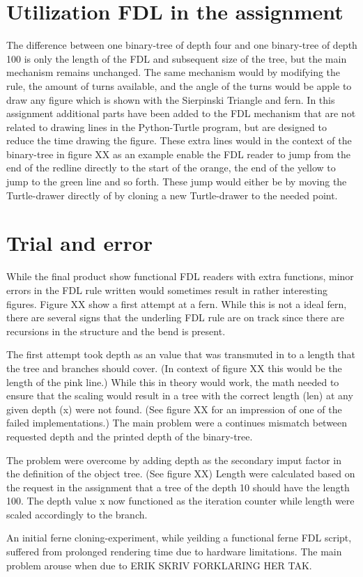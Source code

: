 \documentclass[titlepage]{article}
\begin{document}
\section{Utilization FDL in the assignment}
The difference between one binary-tree of depth four and one binary-tree of depth 100 is only the length of the FDL and subsequent size of the tree, but the main mechanism remains unchanged.  The same mechanism would by modifying the rule, the amount of turns available, and the angle of the turns would be apple to draw any figure which is shown with the Sierpinski Triangle and fern.  In this assignment additional parts have been added to the FDL mechanism that are not related to drawing lines in the Python-Turtle program, but are designed to reduce the time drawing the figure. These extra lines would in the context of the binary-tree in figure XX  as an example enable the FDL reader to jump from the end of the redline directly to the start of the orange, the end of the yellow to jump to the green line and so forth. These jump would either be by moving the Turtle-drawer directly of by cloning a new Turtle-drawer to the needed point. 

\section{Trial and error}
While the final product show functional FDL readers with extra functions, minor errors in the FDL rule written would sometimes result in rather interesting figures. Figure XX  show a first attempt at a fern. While this is not a ideal fern, there are several signs that the underling FDL rule are on track since there are recursions in the structure and the bend is present. \par
The first attempt took depth as an value that was transmuted in to a length that the tree and branches should cover. (In context of figure XX  this would be the length of the pink line.) 
While this in theory would work, the math needed to ensure that the scaling would result in a tree with the correct length (len) at any given depth (x) were not found. (See figure XX  for an impression of one of the failed implementations.) The main problem were a continues mismatch between requested depth and the printed depth of the binary-tree. \par
The problem were overcome by adding depth as the secondary imput factor in the definition of the object tree. (See figure XX)  Length were calculated based on the request in the assignment that a tree of the depth 10 should have the length 100. The depth value x now functioned as the iteration counter while length were scaled accordingly to the branch.\par  
An initial ferne cloning-experiment, while yeilding a functional ferne FDL script, suffered from prolonged rendering time due to hardware limitations. The main problem arouse when due to ERIK SKRIV FORKLARING HER TAK.
\end{document}

